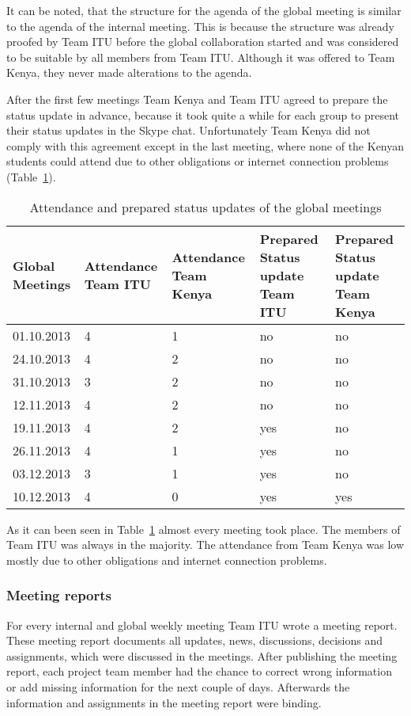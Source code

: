 It can be noted, that the structure for the agenda of the global meeting is similar to the agenda of the internal meeting. This is because the structure was already proofed by Team ITU before the global collaboration started and was considered to be suitable by all members from Team ITU. Although it was offered to Team Kenya, they never made alterations to the agenda.

After the first few meetings Team Kenya and Team ITU agreed to prepare the status update in advance, because it took quite a while for each group to present their status updates in the Skype chat. Unfortunately Team Kenya did not comply with this agreement except in the last meeting, where none of the Kenyan students could attend due to other obligations or internet connection problems (Table~\ref{tab:global_meetings}).

\begin{table}[htb]
	\centering
	\begin{tabular}{ | l |  p{2.5cm} |  p{2.5cm} |  p{3cm} |  p{3cm} |}
    		\hline
   		Global Meetings & Attendance Team ITU &  Attendance Team Kenya & Prepared Status update Team ITU & Prepared Status update Team Kenya\\ \hline
    		01.10.2013 & 4 & 1 & no & no \\ \hline
    		24.10.2013 & 4 & 2 & no & no \\ \hline
    		31.10.2013 & 3 & 2 & no & no \\ \hline
    		12.11.2013 & 4 & 2 & no & no \\ \hline
    		19.11.2013 & 4 & 2 & yes & no \\ \hline
    		26.11.2013 & 4 & 1 & yes & no \\ \hline
    		03.12.2013 & 3 & 1 & yes & no \\ \hline
    		10.12.2013 & 4 & 0 & yes & yes \\ \hline
	\end{tabular}
	\caption{Attendance and prepared status updates of the global meetings}
	\label{tab:global_meetings}
\end{table}

As it can been seen in Table~\ref{tab:global_meetings} almost every meeting took place. The members of Team ITU was always in the majority. The attendance from Team Kenya was low mostly due to other obligations and internet connection problems.


\subsubsection {Meeting reports}
\label{sec:meeting_report}
For every internal and global weekly meeting Team ITU wrote a meeting report. These meeting report documents all updates, news, discussions, decisions and assignments, which were discussed in the meetings. After publishing the meeting report, each project team member had the chance to correct wrong information or add missing information for the next couple of days. Afterwards the information and assignments in the meeting report were binding.

